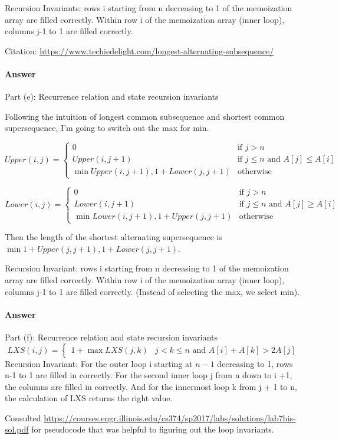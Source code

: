 \documentclass{article}
\begin{document}
Recursion Invariants: rows i starting from n decreasing to 1 of the memoization array are filled correctly. Within row i of the memoization array (inner loop), columns j-1 to 1 are filled correctly. 

Citation: \url{https://www.techiedelight.com/longest-alternating-subsequence/}

\paragraph{Answer}{Part (e): Recurrence relation and state recursion invariants}

Following the intuition of longest common subsequence and shortest common supersequence, I'm going to switch out the max for min. 

\begin{equation}
Upper(i,j) = 
\begin{cases}
0 & \text{if $j > n$}\\
Upper(i, j+1) & \text{if $j \leq n$ and $A[j] \leq A[i]$}\\
\min{Upper(i, j+1), 1 + Lower(j, j+1)} & \text{otherwise}
\end{cases}
\end{equation}

\begin{equation}
Lower(i,j) = 
\begin{cases}
0 & \text{if $j > n$}\\
Lower(i, j+1) & \text{if $j \leq n$ and $A[j] \geq A[i]$}\\
\min{Lower(i, j+1), 1 + Upper(j, j+1)} & \text{otherwise}
\end{cases}
\end{equation}

Then the length of the shortest alternating supersequence is $\min{1 + Upper(j, j+1), 1 + Lower(j, j+1)}$.

Recursion Invariant: rows i starting from n decreasing to 1 of the memoization array are filled correctly. Within row i of the memoization array (inner loop), columns j-1 to 1 are filled correctly. (Instead of selecting the max, we select min). 

\paragraph{Answer}{Part (f): Recurrence relation and state recursion invariants}
\begin{equation}
LXS(i,j) =
\begin{cases}
1 + \max{LXS(j, k)} & \text{$j < k \leq n$ and $A[i] + A[k] > 2A[j]$}
\end{cases}
\end{equation}
Recursion Invariant: For the outer loop i starting at $n-1$ decreasing to 1, rows n-1 to 1 are filled in correctly. For the second inner loop j from n down to i +1, the columns are filled in correctly. And for the innermost loop k from j + 1 to n, the calculation of LXS returns the right value.

Consulted \url{https://courses.engr.illinois.edu/cs374/sp2017/labs/solutions/lab7bis-sol.pdf} for pseudocode that was helpful to figuring out the loop invariants.
\end{document}
